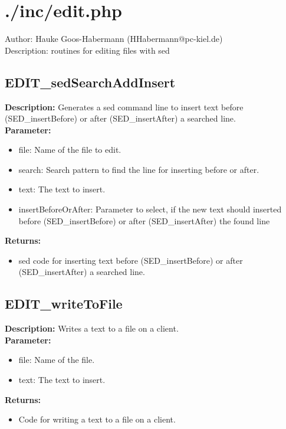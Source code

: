 \newpage\section{./inc/edit.php}
 Author: Hauke Goos-Habermann (HHabermann@pc-kiel.de)\\
 Description: routines for editing files with sed\\

\subsection{EDIT\_sedSearchAddInsert}
\textbf{Description:} Generates a sed command line to insert text before (SED\_insertBefore) or after (SED\_insertAfter) a searched line.\\
\textbf{Parameter:}
\begin{itemize}
\item file: Name of the file to edit.
\item search: Search pattern to find the line for inserting before or after.
\item text: The text to insert.
\item insertBeforeOrAfter: Parameter to select, if the new text should inserted before (SED\_insertBefore) or after (SED\_insertAfter) the found line
\end{itemize}
\textbf{Returns:}
\begin{itemize}
\item sed code for inserting text before (SED\_insertBefore) or after (SED\_insertAfter) a searched line.
\end{itemize}

\subsection{EDIT\_writeToFile}
\textbf{Description:} Writes a text to a file on a client.\\
\textbf{Parameter:}
\begin{itemize}
\item file: Name of the file.
\item text: The text to insert.
\end{itemize}
\textbf{Returns:}
\begin{itemize}
\item Code for writing a text to a file on a client.
\end{itemize}

